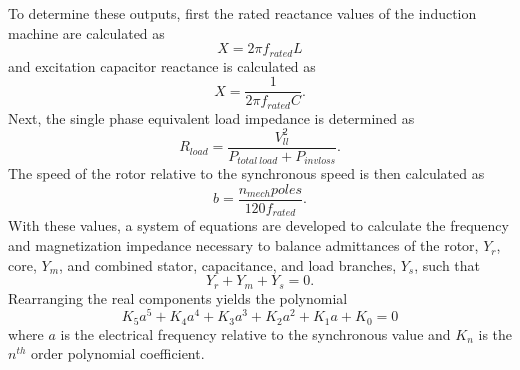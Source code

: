 To determine these outputs, first the rated reactance values of the induction machine are calculated as
\begin{equation}
X = 2 \pi f_{rated} L
\end{equation}
and excitation capacitor reactance is calculated as
\begin{equation}
X = \frac{1}{2 \pi f_{rated} C}.
\end{equation}
Next, the single phase equivalent load impedance is determined as 
\begin{equation}
R_{load} = \frac{V_{ll}^2}{P_{total\ load} + P_{inv loss}}.
\end{equation} 
The speed of the rotor relative to the synchronous speed is then calculated as 
\begin{equation}
b = \frac{n_{mech}poles}{120f_{rated}}.
\end{equation}
With these values, a system of equations are developed to calculate the frequency and magnetization impedance necessary to balance admittances of the rotor, $Y_r$, core, $Y_m$, and combined stator, capacitance, and load branches, $Y_s$, such that 
\begin{equation}
\label{eq:admit}
Y_r + Y_m + Y_s = 0.
\end{equation}
Rearranging the real components yields the polynomial 
\begin{equation}
K_5a^5 + K_4a^4 + K_3a^3 + K_2a^2 + K_1a + K_0 = 0
\end{equation}
where $a$ is the electrical frequency relative to the synchronous value and $K_n$ is the $n^{th}$ order polynomial coefficient. %


